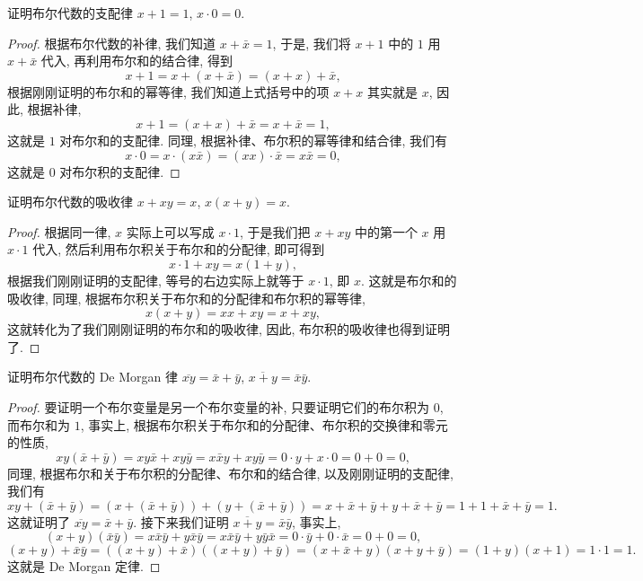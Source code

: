 \documentclass[10pt,UTF8]{book} %
\begin{document}
\begin{example}
    证明布尔代数的支配律 $x+1=1$, $x\cdot 0 = 0$.
    \begin{proof}
        根据布尔代数的补律, 我们知道 $x + \bar x = 1$, 于是, 我们将 $x + 1$ 中的 $1$
        用 $x + \bar x$ 代入, 再利用布尔和的结合律, 得到
        \[ x+1 = x+\left( x+ \bar x \right) = \left( x+x \right) + \bar x, \]
        根据刚刚证明的布尔和的幂等律, 我们知道上式括号中的项 $x+x$ 其实就是 $x$, 因此,
        根据补律,
        \[ x+1 = (x+x) + \bar x = x+ \bar x = 1, \]
        这就是 $1$ 对布尔和的支配律. 同理, 根据补律、布尔积的幂等律和结合律, 我们有
        \[ x \cdot 0 = x \cdot \left( x \bar x \right) = \left( xx \right) \cdot \bar x 
        = x\bar x = 0, \]
        这就是 $0$ 对布尔积的支配律.
    \end{proof}
\end{example}

\begin{example}
    证明布尔代数的吸收律 $x+xy = x$, $x(x+y)=x$.
    \begin{proof}
        根据同一律, $x$ 实际上可以写成 $x \cdot 1$, 于是我们把 $x+xy$ 中的第一个 $x$
        用 $x \cdot 1$ 代入, 然后利用布尔积关于布尔和的分配律, 即可得到
        \[ x \cdot 1 + xy = x(1+y), \]
        根据我们刚刚证明的支配律, 等号的右边实际上就等于 $x \cdot 1$, 即 $x$.
        这就是布尔和的吸收律,
        同理, 根据布尔积关于布尔和的分配律和布尔积的幂等律,
        \[ x(x+y) = xx+xy = x+xy, \]
        这就转化为了我们刚刚证明的布尔和的吸收律, 因此, 布尔积的吸收律也得到证明了.
    \end{proof}
\end{example}

\begin{example}
    证明布尔代数的 De Morgan 律 $\overline{xy} = \bar x + \bar y$, 
    $\overline{x+y} = \bar x \bar y$.
    \begin{proof}
        要证明一个布尔变量是另一个布尔变量的补, 只要证明它们的布尔积为 $0$, 而布尔和为 $1$,
        事实上, 根据布尔积关于布尔和的分配律、布尔积的交换律和零元的性质,
        \[ xy\left( \bar x + \bar y \right) = xy\bar x + xy \bar y 
        = x \bar x y + xy \bar y = 0 \cdot y + x \cdot 0 = 0+0 =0,\]
        同理, 根据布尔和关于布尔积的分配律、布尔和的结合律, 以及刚刚证明的支配律, 我们有
        \[ xy + \left( \bar x + \bar y \right) 
        = \left(
            x+\left( \bar x + \bar y \right)
        \right) + \left(
            y+\left( \bar x + \bar y \right)
        \right) = x + \bar x + \bar y + y + \bar x + \bar y 
        = 1 + 1 + \bar x + \bar y = 1. \]
        这就证明了 $\overline{xy} = \bar x + \bar y$.
        接下来我们证明 $\overline{x+y} = \bar x \bar y$, 事实上,
        \[ (x+y)(\bar x \bar y)
        = x\bar x \bar y + y\bar x \bar y 
        = x \bar x \bar y + y \bar y \bar x 
        = 0 \cdot \bar y + 0 \cdot \bar x = 0+0 = 0, \]
        \[ (x+y) + \bar x\bar y =
        \left((x+y)+\bar x\right)\left((x+y)+\bar y\right)
        = \left( x+\bar x + y \right)\left( x+y +\bar y \right)
        = (1+y)(x+1) = 1 \cdot 1 = 1. \]
        这就是 De Morgan 定律.
    \end{proof}
\end{example}
\end{document}
